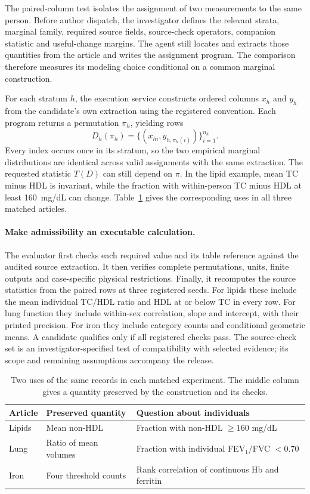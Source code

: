 \documentclass[sigconf,anonymous,review]{acmart}
\begin{document}
The paired-column test isolates the assignment of two measurements to the same person. Before author dispatch, the investigator defines the relevant strata, marginal family, required source fields, source-check operators, companion statistic and useful-change margins. The agent still locates and extracts those quantities from the article and writes the assignment program. The comparison therefore measures its modeling choice conditional on a common marginal construction.

For each stratum $h$, the execution service constructs ordered columns $x_h$ and $y_h$ from the candidate's own extraction using the registered convention. Each program returns a permutation $\pi_h$, yielding rows
\[
 D_h(\pi_h)=\{(x_{hi},y_{h,\pi_h(i)})\}_{i=1}^{n_h}.
\]
Every index occurs once in its stratum, so the two empirical marginal distributions are identical across valid assignments with the same extraction. The requested statistic $T(D)$ can still depend on $\pi$. In the lipid example, mean TC minus HDL is invariant, while the fraction with within-person TC minus HDL at least 160~mg/dL can change. Table~\ref{tab:uses} gives the corresponding uses in all three matched articles.

\paragraph{Make admissibility an executable calculation.}
The evaluator first checks each required value and its table reference against the audited source extraction. It then verifies complete permutations, units, finite outputs and case-specific physical restrictions. Finally, it recomputes the source statistics from the paired rows at three registered seeds. For lipids these include the mean individual TC/HDL ratio and HDL at or below TC in every row. For lung function they include within-sex correlation, slope and intercept, with their printed precision. For iron they include category counts and conditional geometric means. A candidate qualifies only if all registered checks pass. The source-check set is an investigator-specified test of compatibility with selected evidence; its scope and remaining assumptions accompany the release.

\begin{table}[tbp]
\caption{Two uses of the same records in each matched experiment. The middle column gives a quantity preserved by the construction and its checks.}
\label{tab:uses}
\small\centering
\begin{tabular}{@{}p{}p{}p{}@{}}
\toprule
Article & Preserved quantity & Question about individuals\\
\midrule
Lipids & Mean non-HDL & Fraction with non-HDL $\ge160$ mg/dL\\
Lung & Ratio of mean volumes & Fraction with individual FEV$_1$/FVC $<0.70$\\
Iron & Four threshold counts & Rank correlation of continuous Hb and ferritin\\
\bottomrule
\end{tabular}
\end{table}
\end{document}
